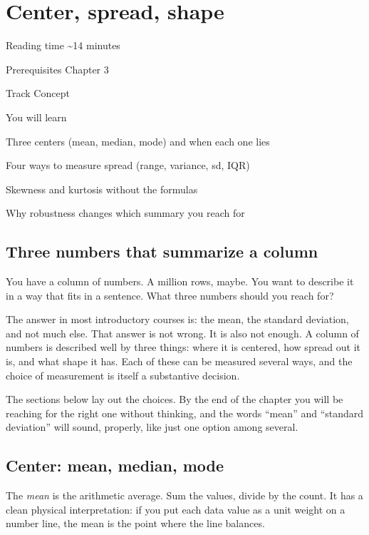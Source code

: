 \documentclass[
  letterpaper,
  11pt,
  twoside,
  openany]{scrbook}
\begin{document}
\chapter{Center, spread, shape}\label{center-spread-shape}

{Reading time} {\textasciitilde14 minutes}

{Prerequisites} {Chapter 3}

{Track} {Concept}

{You will learn}

Three centers (mean, median, mode) and when each one lies

Four ways to measure spread (range, variance, sd, IQR)

Skewness and kurtosis without the formulas

Why robustness changes which summary you reach for

\section{Three numbers that summarize a
column}\label{three-numbers-that-summarize-a-column}

You have a column of numbers. A million rows, maybe. You want to
describe it in a way that fits in a sentence. What three numbers should
you reach for?

The answer in most introductory courses is: the mean, the standard
deviation, and not much else. That answer is not wrong. It is also not
enough. A column of numbers is described well by three things: where it
is centered, how spread out it is, and what shape it has. Each of these
can be measured several ways, and the choice of measurement is itself a
substantive decision.

The sections below lay out the choices. By the end of the chapter you
will be reaching for the right one without thinking, and the words
``mean'' and ``standard deviation'' will sound, properly, like just one
option among several.

\section{Center: mean, median, mode}\label{center-mean-median-mode}

The \emph{mean} is the arithmetic average. Sum the values, divide by the
count. It has a clean physical interpretation: if you put each data
value as a unit weight on a number line, the mean is the point where the
line balances.
\end{document}
